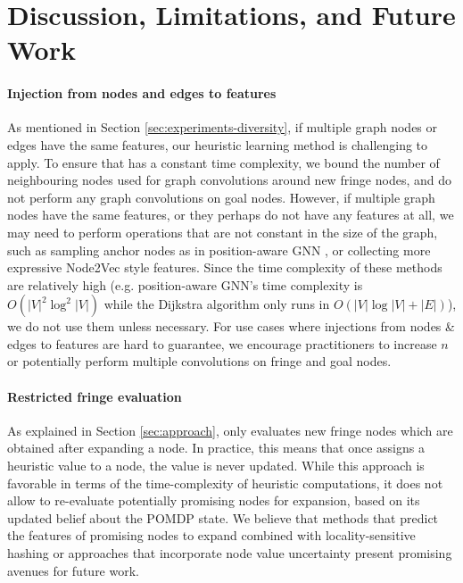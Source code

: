 \newpage

\section{Discussion, Limitations, and Future Work}
\label{sec:future-work}


\paragraph{Injection from nodes and edges to features}  As mentioned in Section \ref{sec:experiments-diversity}, if multiple graph nodes or edges have the same features, our heuristic learning method is challenging to apply. To ensure that \phil has a constant time complexity, we bound the number of neighbouring nodes used for graph convolutions around new fringe nodes, and do not perform any graph convolutions on goal nodes. However, if multiple graph nodes have the same features, or they perhaps do not have any features at all, we may need to perform operations that are not constant in the size of the graph, such as sampling anchor nodes as in position-aware GNN \cite{you2019position}, or collecting more expressive Node2Vec \cite{grover2016node2vec} style features. Since the time complexity of these methods are relatively high (e.g. position-aware GNN's time complexity is $O(|V|^2\log^2|V|)$ while the Dijkstra algorithm only runs in $O(|V|\log|V| + |E|)$), we do not use them unless necessary. For use cases where injections from nodes \& edges to features are hard to guarantee, we encourage practitioners to increase $n$ or potentially perform multiple convolutions on fringe and goal nodes.

\paragraph{Restricted fringe evaluation} As explained in Section \ref{sec:approach}, \phil only evaluates new fringe nodes which are obtained after expanding a node. In practice, this means that once \phil assigns a heuristic value to a node, the value is never updated. While this approach is favorable in terms of the time-complexity of heuristic computations, it does not allow \phil to re-evaluate potentially promising nodes for expansion, based on its updated belief about the POMDP state. We believe that methods that predict the features of promising nodes to expand combined with locality-sensitive hashing or approaches that incorporate node value uncertainty present promising avenues for future work.

